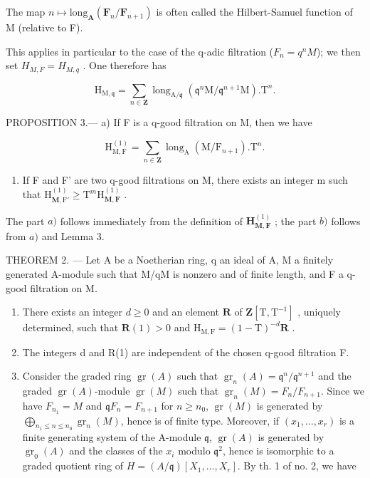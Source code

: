 The map \(n\mapsto\text{long}_{\mathbf{A}}(\mathbf{F}_{n}/\mathbf{F}_{n+1})\) is often called the Hilbert-Samuel function of M (relative to F).

This applies in particular to the case of the q-adic filtration (\(F_{n} = q^{n}M\)); we then set \(H_{M,F} = H_{M,q}\) . One therefore has

\[
\mathrm{H} _ {\mathrm{M}, \mathfrak {q}} = \sum_ {n \in \mathbf {Z}} \operatorname{long} _ {\mathrm{A} / \mathfrak {q}} (\mathfrak {q} ^ {n} \mathrm{M} / \mathfrak {q} ^ {n + 1} \mathrm{M}). \mathrm{T} ^ {n}.\tag{9}
\]

PROPOSITION 3.--- a) If F is a q-good filtration on M, then we have

\[
\mathrm{H} _ {\mathrm{M}, \mathrm{F}} ^ {(1)} = \sum_ {n \in \mathbf {Z}} \operatorname{long} _ {\mathrm{A}} (\mathrm{M} / \mathrm{F} _ {n + 1}). \mathrm{T} ^ {n}.\tag{10}
\]

\begin{enumerate}
\def\labelenumi{\alph{enumi})}
\setcounter{enumi}{1}
\tightlist
\item
  If F and F' are two q-good filtrations on M, there exists an integer m such that \(\mathrm{H}_{\mathbf{M},\mathrm{F}'}^{(1)} \geqslant \mathrm{T}^{m}\mathrm{H}_{\mathbf{M},\mathbf{F}}^{(1)}\) .
\end{enumerate}

The part \(a)\) follows immediately from the definition of \(\mathbf{H}_{\mathbf{M},\mathbf{F}}^{(1)}\) ; the part \(b)\) follows from \(a)\) and Lemma 3.

THEOREM 2. --- Let A be a Noetherian ring, q an ideal of A, M a finitely generated A-module such that M/qM is nonzero and of finite length, and F a q-good filtration on M.

\begin{enumerate}
\def\labelenumi{\alph{enumi})}
\item
  There exists an integer \(d \geqslant 0\) and an element \(\mathbf{R}\) of \(\mathbf{Z}[\mathrm{T}, \mathrm{T}^{-1}]\) , uniquely determined, such that \(\mathbf{R}(1) > 0\) and \(\mathrm{H}_{\mathrm{M,F}} = (1 - \mathrm{T})^{-d}\mathbf{R}\) .
\item
  The integers d and R(1) are independent of the chosen q-good filtration F.
\item
  Consider the graded ring \(\operatorname{gr}(A)\) such that \(\operatorname{gr}_{n}(A) = \mathfrak{q}^{n}/\mathfrak{q}^{n+1}\) and the graded \(\operatorname{gr}(A)\)-module \(\operatorname{gr}(M)\) such that \(\operatorname{gr}_{n}(M) = F_{n}/F_{n+1}\). Since we have \(F_{n_{1}} = M\) and \(\mathfrak{q}F_{n} = F_{n+1}\) for \(n \geqslant n_{0}\), \(\operatorname{gr}(M)\) is generated by \(\bigoplus_{n_{1} \leqslant n \leqslant n_{0}} \operatorname{gr}_{n}(M)\), hence is of finite type. Moreover, if \((x_{1},\ldots,x_{r})\) is a finite generating system of the A-module \(\mathfrak{q}\), \(\operatorname{gr}(A)\) is generated by \(\operatorname{gr}_{0}(A)\) and the classes of the \(x_{i}\) modulo \(\mathfrak{q}^{2}\), hence is isomorphic to a graded quotient ring of \(H = (A/\mathfrak{q})[X_{1},\ldots,X_{r}]\). By th. 1 of no. 2, we have
\end{enumerate}

